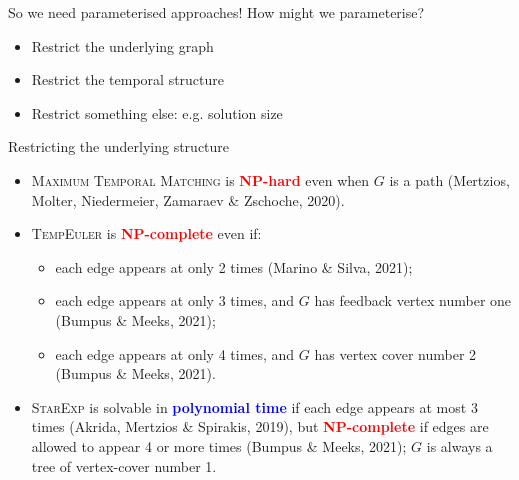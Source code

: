 \documentclass[10pt, compress]{beamer}
\begin{document}
\begin{frame}{So we need parameterised approaches!}
How might we parameterise?
\begin{itemize}
    \item Restrict the underlying graph
    \item Restrict the temporal structure
    \item Restrict something else: e.g. solution size
\end{itemize}
\end{frame}

\begin{frame}{Restricting the underlying structure}

\begin{itemize}
\item \textsc{Maximum Temporal Matching} is \textbf{\textcolor{red}{NP-hard}} even when $G$ is a path (Mertzios, Molter, Niedermeier, Zamaraev \& Zschoche, 2020).
\item \textsc{TempEuler} is \textbf{\textcolor{red}{NP-complete}} even if:
\begin{itemize}
\item each edge appears at only 2 times (Marino \& Silva, 2021);
\item each edge appears at only 3 times, and $G$ has feedback vertex number one (Bumpus \& Meeks, 2021);
\item each edge appears at only 4 times, and $G$ has vertex cover number 2 (Bumpus \& Meeks, 2021). 
\end{itemize}
\item \textsc{StarExp} is solvable in \textbf{\textcolor{blue}{polynomial time}} if each edge appears at most 3 times (Akrida, Mertzios \& Spirakis, 2019), but \textbf{\textcolor{red}{NP-complete}}  if edges are allowed to appear 4 or more times (Bumpus \& Meeks, 2021); $G$ is always a tree of vertex-cover number 1.
\end{itemize}
\end{frame}
\end{document}
